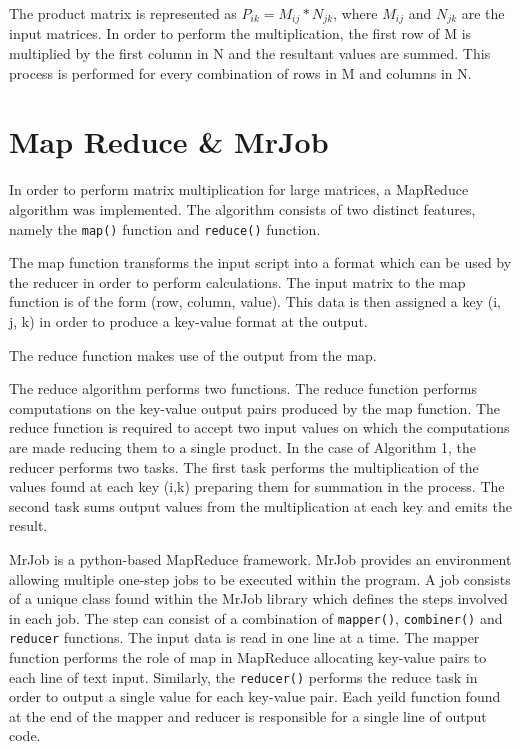 \documentclass[10pt,twocolumn]{witseiepaper}
\begin{document}
The product matrix is represented as $P_{ik} = M_{ij} * N_{jk}$, where $M_{ij}$ and $N_{jk}$ are the input matrices. In order to perform the multiplication, the first row of M is multiplied by the first column in N and the resultant values are summed. This process is performed for every combination of rows in M and columns in N. 

\section{Map Reduce \& MrJob}

In order to perform matrix multiplication for large matrices, a MapReduce algorithm was implemented. The algorithm consists of two distinct features, namely the \verb|map()| function and \verb|reduce()| function. 

The map function transforms the input script into a format which can be used by the reducer in order to perform calculations. The input matrix to the map function is of the form (row, column, value). This data is then assigned a key (i, j, k) in order to produce a key-value format at the output.

The reduce function makes use of the output from the map. 

The reduce algorithm performs two functions. The reduce function performs computations on the key-value output pairs produced by the map function. The reduce function is required to accept two input values on which the computations are made reducing them to a single product. In the case of Algorithm 1, the reducer performs two tasks. The first task performs the multiplication of the values found at each key (i,k) preparing them for summation in the process. The second task sums output values from the multiplication at each key and emits the result.

MrJob is a python-based MapReduce framework. MrJob provides an environment allowing multiple one-step jobs to be executed within the program. A job consists of a unique class found within the MrJob library which defines the steps involved in each job. The step can  consist of a combination of \verb|mapper()|, \verb|combiner()| and \verb|reducer| functions. The input data is read in one line at a time. The mapper function performs the role of map in MapReduce allocating key-value pairs to each line of text input. Similarly, the \verb|reducer()| performs the reduce task in order to output a single value for each key-value pair.  Each yeild function found at the end of the mapper and reducer is responsible for a single line of output code.
\end{document}
